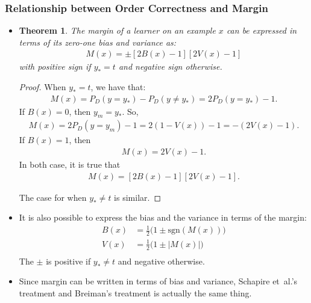 \documentclass[10pt]{article}
\newtheorem{theorem}[lemma]{Theorem}
\newcommand{\etal}{{et~al.}}
\begin{document}
  \subsubsection{Relationship between Order Correctness and Margin}
  
  \begin{itemize}
    \item \begin{theorem}
      The margin of a learner on an example $x$ can be expressed in terms of its zero-one bias and variance as:
      \begin{align*}
        M(x) = \pm [2B(x)-1][2V(x)-1]
      \end{align*}
      with positive sign if $y_* = t$ and negative sign otherwise.
    \end{theorem}

    \begin{proof}
      When $y_* = t$, we have that:
      \begin{align*}
        M(x) = P_D(y = y_*) - P_D(y \neq y_*) = 2P_D(y=y_*)-1.
      \end{align*}
      If $B(x) = 0$, then $y_m = y_*$. So,
      \begin{align*}
        M(x) = 2P_D(y = y_m) - 1 = 2(1 - V(x)) - 1 = -(2V(x)-1).
      \end{align*}
      If $B(x) = 1$, then
      \begin{align*}
        M(x) = 2V(x)-1.
      \end{align*}
      In both case, it is true that
      \begin{align*}
        M(x) = [2B(x)-1][2V(x)-1].
      \end{align*}

      The case for when $y_* \neq t$ is similar.
    \end{proof}

    \item It is also possible to express the bias and the variance in terms of the margin:
    \begin{align*}
      B(x) &= \frac{1}{2}\big( 1 \pm \mathrm{sgn}(M(x)) \big) \\
      V(x) &= \frac{1}{2}\big( 1 \pm |M(x)| \big) \\
    \end{align*}
    The $\pm$ is positive if $y_* \neq t$ and negative otherwise.

    \item Since margin can be written in terms of bias and variance, Schapire \etal's treatment and Breiman's treatment is actually the same thing.


\end{itemize}
\end{document}
